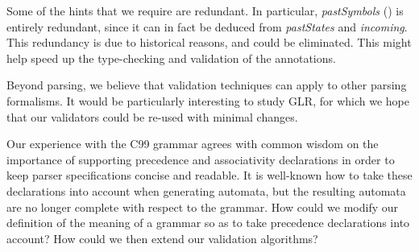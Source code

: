 \documentclass{llncs}
\begin{document}
Some of the hints that we require are redundant. In particular,
\textit{pastSymbols} () is entirely redundant, since 
it can in fact be deduced from \textit{pastStates} and \textit{incoming}.
This redundancy is due to historical reasons, and could be eliminated. This
might help speed up the type-checking and validation of the annotations.


Beyond \lrone parsing, we believe that validation techniques can apply
to other parsing formalisms. It would be particularly interesting to study
GLR, for which we hope that our validators could be re-used with
minimal changes.


Our experience with the C99 grammar agrees with common wisdom on the
importance of supporting precedence and associativity declarations in order to
keep parser specifications concise and readable.  It is well-known how to take
these declarations into account when generating \lrone automata, but the
resulting automata are no longer complete with respect to the grammar. How
could we modify our definition of the meaning of a grammar so as to take
precedence declarations into account?
How could we then extend our validation algorithms?



\end{document}
